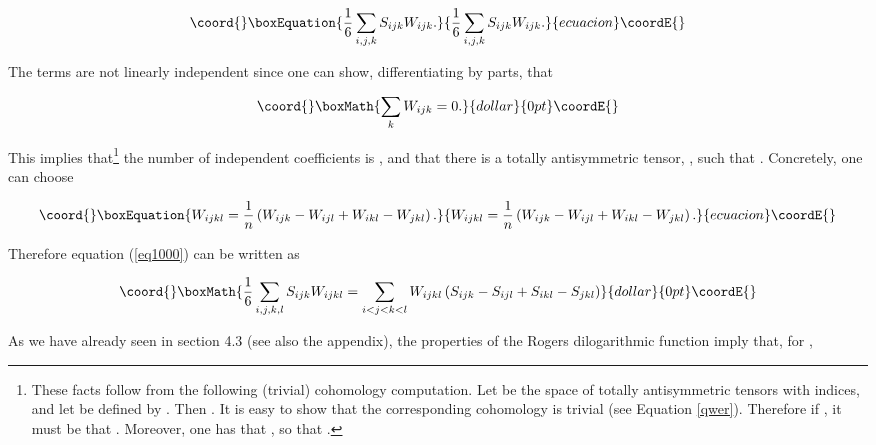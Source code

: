 \documentclass[a4paper,11pt]{article}
\providecommand{\func}[1]{{#1}}
\begin{document}
\begin{equation}\coord{}\boxEquation{
\frac{1}{6}\sum_{i,j,k}S_{ijk}W_{ijk}.  \label{eq1000}
}{
\frac{1}{6}\sum_{i,j,k}S_{ijk}W_{ijk}.  }{ecuacion}\coordE{}\end{equation}

\noindent
The terms \coordHE{} are not linearly independent since one can show,
differentiating by parts, that 

$$\coord{}\boxMath{
\sum_{k}W_{ijk}=0.
}{dollar}{0pt}\coordE{}$$

\noindent
This implies that\footnote{
These facts follow from the following (trivial) cohomology computation. 
Let \coordHE{} be the space of totally antisymmetric tensors with \coordHE{} indices, 
and let \coordHE{} be defined by \coordHE{}. Then \coordHE{}. It is easy to show that the corresponding cohomology
is trivial (see Equation \ref{qwer}).
Therefore if \coordHE{}, it must be that \coordHE{}. Moreover, one has that \myHighlight{$\dim \ker \delta _{k+1}=\dim
C^{k+1}-\dim \func{Im}\delta _{k}=\dim C^{k+1}-\dim \ker \delta _{k}$}\coordHE{}, so
that \coordHE{}.}
the number of independent coefficients \coordHE{} is \coordHE{}, and that there is a totally antisymmetric tensor, 
\coordHE{}, such that \coordHE{}. Concretely, one can choose 

\begin{equation}\coord{}\boxEquation{
W_{ijkl}=\frac{1}{n}\left( W_{ijk}-W_{ijl}+W_{ikl}-W_{jkl}\right).    \label{qwer}
}{
W_{ijkl}=\frac{1}{n}\left( W_{ijk}-W_{ijl}+W_{ikl}-W_{jkl}\right).    }{ecuacion}\coordE{}\end{equation}

\noindent
Therefore equation (\ref{eq1000}) can be written as 

$$\coord{}\boxMath{
\frac{1}{6}\sum_{i,j,k,l}S_{ijk}W_{ijkl}=\sum_{i<j<k<l}W_{ijkl}\left(
S_{ijk}-S_{ijl}+S_{ikl}-S_{jkl}\right)
}{dollar}{0pt}\coordE{}$$

\noindent
As we have already seen in section 4.3 (see also the appendix), the 
properties of the Rogers dilogarithmic function imply that, for \coordHE{}, 
\end{document}
